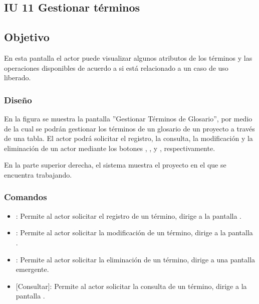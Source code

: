 \subsection{IU 11 Gestionar términos}

\subsection{Objetivo}
	En esta pantalla el actor puede visualizar algunos atributos de los términos y las operaciones disponibles de acuerdo a si está relacionado a un caso de uso liberado.
\subsubsection{Diseño}
	En la figura  se muestra la pantalla ''Gestionar Términos de Glosario'', por medio de la cual se podrán gestionar los términos de un glosario de un proyecto a través de una tabla. El actor podrá solicitar el registro, la consulta, la modificación y la eliminación de un actor mediante los botones , , \editar y \eliminar, respectivamente.
	
	En la parte superior derecha, el sistema muestra el proyecto en el que se encuentra trabajando.

\subsubsection{Comandos}
\begin{itemize}
	\item {}: Permite al actor solicitar el registro de un término, dirige a la pantalla .
	\item \editar [Modificar]: Permite al actor solicitar la modificación de un término, dirige a la pantalla .
	\item \eliminar [Eliminar]: Permite al actor solicitar la eliminación de un término, dirige a una pantalla emergente.
	\item {} [Consultar]: Permite al actor solicitar la consulta de un término, dirige a la pantalla  .
\end{itemize}

